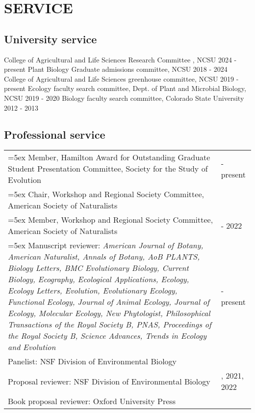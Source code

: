 \documentclass[11pt,english]{article}\usepackage[]{graphicx}\usepackage[]{xcolor}
\providecommand{\tabularnewline}{\\}
\begin{document}
\vspace{1.5ex}
\section*{SERVICE}
\vspace{-0.5ex}
\subsection*{University service}
College of Agricultural and Life Sciences Research Committee , NCSU \hfill{2024 - present} \newline
Plant Biology Graduate admissions committee, NCSU \hfill{2018 - 2024} \newline
College of Agricultural and Life Sciences greenhouse committee, NCSU \hfill{2019 - present}\newline
Ecology faculty search committee, Dept. of Plant and Microbial Biology, NCSU \hfill{2019 - 2020 }\newline
Biology faculty search committee, Colorado State University \hfill{2012 - 2013} 

\subsection*{Professional service}
\renewcommand{\arraystretch}{1.2}
\begin{tabularx}{\textwidth}{@{}>{\raggedright}p{5.25in} >{\raggedleft}X@{}}
\hangindent=5ex Member, Hamilton Award for Outstanding Graduate Student Presentation Committee, Society for the Study of Evolution & 2024 - present \tabularnewline
\hangindent=5ex Chair, Workshop and Regional Society Committee, American Society of Naturalists & 2023 \tabularnewline
\hangindent=5ex Member, Workshop and Regional Society Committee, American Society of Naturalists & 2021 - 2022 \tabularnewline

\hangindent=5ex Manuscript reviewer: \emph{American Journal of Botany, American Naturalist, Annals of Botany, AoB PLANTS, Biology Letters, BMC Evolutionary Biology, Current Biology, Ecography, Ecological Applications, Ecology, Ecology Letters, Evolution, Evolutionary Ecology, Functional Ecology, Journal of Animal Ecology, Journal of Ecology, Molecular Ecology, New Phytologist, Philosophical Transactions of the Royal Society B, PNAS, Proceedings of the Royal Society B, Science Advances, Trends in Ecology and Evolution} & 2009 - present \tabularnewline

Panelist: NSF Division of Environmental Biology & 2022 \tabularnewline    
Proposal reviewer: NSF Division of Environmental Biology & 2014, 2021, 2022 \tabularnewline    
Book proposal reviewer: Oxford University Press & 2018 \tabularnewline                               
\end{tabularx}
\end{document}
